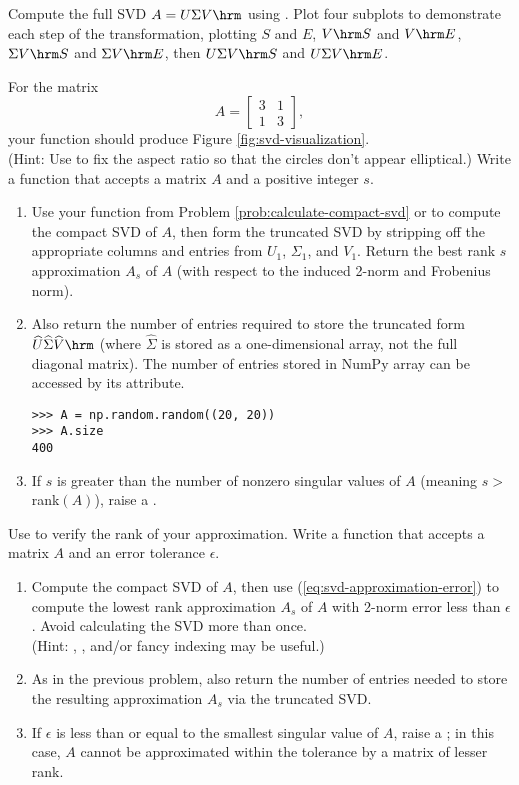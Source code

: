 Compute the full SVD $A = U\Sigma V\hrm$ using .
Plot four subplots to demonstrate each step of the transformation, plotting $S$ and $E$, $V\hrm S$ and $V\hrm E$, $\Sigma V\hrm S$ and $\Sigma V\hrm E$, then $U\Sigma V\hrm S$ and $U \Sigma V\hrm E$.

For the matrix \[A =  \left[\begin{array}{cc}3 & 1\\1 & 3\end{array}\right],\]
your function should produce Figure \ref{fig:svd-visualization}.
\\
(Hint: Use  to fix the aspect ratio so that the circles don't appear elliptical.)
Write a function that accepts a matrix $A$ and a positive integer $s$.
\begin{enumerate}
\item Use your function from Problem \ref{prob:calculate-compact-svd} or  to compute the compact SVD of $A$, then form the truncated SVD by stripping off the appropriate columns and entries from $U_1$, $\Sigma_1$, and $V_1$.
Return the best rank $s$ approximation $A_s$ of $A$ (with respect to the induced 2-norm and Frobenius norm).
\item Also return the number of entries required to store the truncated form $\widehat{U}\widehat{\Sigma} \widehat{V}\hrm$ (where $\widehat{\Sigma}$ is stored as a one-dimensional array, not the full diagonal matrix).
The number of entries stored in NumPy array can be accessed by its  attribute.
\begin{lstlisting}
>>> A = np.random.random((20, 20))
>>> A.size
400
\end{lstlisting}
\item If $s$ is greater than the number of nonzero singular values of $A$ (meaning $s > $ rank$(A)$), raise a .
\end{enumerate}
Use  to verify the rank of your approximation.
\label{prob:svd_approx}
Write a function that accepts a matrix $A$ and an error tolerance $\epsilon$.
\begin{enumerate}
\item Compute the compact SVD of $A$, then use (\ref{eq:svd-approximation-error}) to compute the lowest rank approximation $A_s$ of $A$ with 2-norm error less than $\epsilon$.
Avoid calculating the SVD more than once.
\\ (Hint: , , and/or fancy indexing may be useful.)
\item As in the previous problem, also return the number of entries needed to store the resulting approximation $A_s$ via the truncated SVD.
\item If $\epsilon$ is less than or equal to the smallest singular value of $A$, raise a ; in this case, $A$ cannot be approximated within the tolerance by a matrix of lesser rank.
\end{enumerate}
